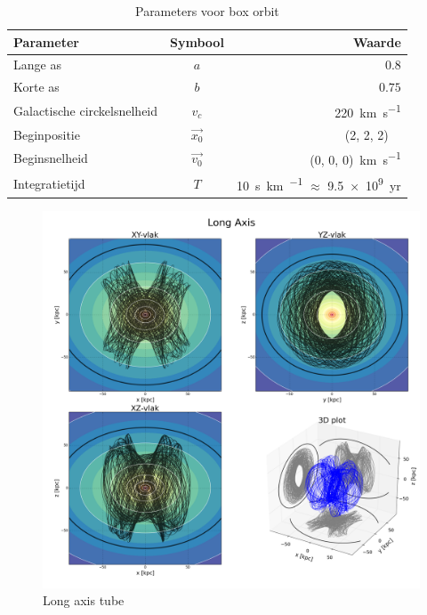 \documentclass[11pt,a4paper,twoside,dutch]{article}
\begin{document}
\begin{table}[t]
\centering
\begin{tabular}{lcr}
	\hline
	\textbf{Parameter} & \textbf{Symbool} & \textbf{Waarde} \\
	\hline
	Lange as & $a$ & $0.8$\\
	Korte as & $b$ & $0.75$\\
	Galactische circkelsnelheid & $v_c$ & \SI{220}{\kilo\meter\per\second}\\
	Beginpositie & $\vec{x_0}$ & (2, 2, 2)~\si{\kilo\parsec}\\
	Beginsnelheid & $\vec{v_0}$ & (0, 0, 0)~\si{\kilo\meter\per\second}\\
	Integratietijd & $T$ & \SI{10}{\second\kilo\meter\per\parsec} $\approx$ \num{9.5e9}~yr \\
	\hline
\end{tabular}
\caption{Parameters voor box orbit}
\label{tab:boxparam}
\end{table}

\newpage
\begin{figure}[t]
\centering
\includegraphics[width=1\textwidth]{img/long.png}
\caption{Long axis tube}
\label{fig:longplot}
\end{figure}
\end{document}
